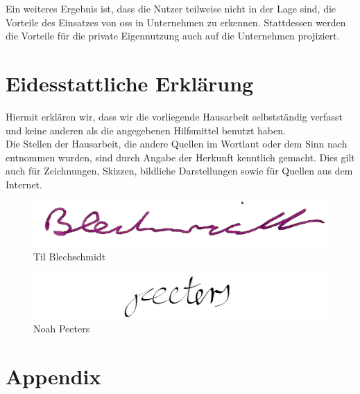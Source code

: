 \documentclass[a4paper]{article}
\begin{document}
            Ein weiteres Ergebnis ist, dass die Nutzer teilweise nicht in der Lage sind, die Vorteile des Einsatzes von \gls{oss} in Unternehmen zu erkennen. Stattdessen werden die Vorteile für die private Eigennutzung auch auf die Unternehmen projiziert.
                
    \clearpage
    \section{Eidesstattliche Erklärung}
        Hiermit erklären wir, dass wir die vorliegende Hausarbeit selbstständig verfasst und keine anderen als die angegebenen Hilfsmittel benutzt haben.\\
        Die Stellen der Hausarbeit, die andere Quellen im Wortlaut oder dem Sinn nach entnommen wurden, sind durch Angabe der Herkunft kenntlich gemacht. Dies gilt auch für Zeichnungen, Skizzen, bildliche Darstellungen sowie für Quellen aus dem Internet.
        
        
        \begin{figure}[H]
            \centering
            \begin{minipage}{.5\textwidth}
                \centering
                \includegraphics[width=\textwidth]{assets/signature_tilb.png}
                Til Blechschmidt
            \end{minipage}%
            \begin{minipage}{.5\textwidth}
                \centering
                \includegraphics[width=\textwidth]{assets/signature_noahp.png}
                Noah Peeters
            \end{minipage}
        \end{figure}
        \clearpage
    
    \clearpage
    \section{Appendix}
        \printglossary[type=\acronymtype]
        \printglossary
        
\end{document}
